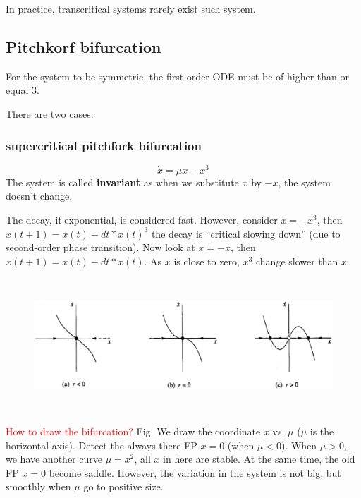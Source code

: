 In practice, transcritical systems rarely exist such system. 

\subsection{Pitchkorf bifurcation}
\label{sec:pitchk-bifurc}

For the system to be symmetric, the first-order ODE must be of higher
than or equal 3.

There are two cases:

\subsubsection{supercritical pitchfork bifurcation}
\label{sec:supercr-pitchf-bifur}

\begin{equation}
  \label{eq:671}
  \dot{x} = \mu x - x^3
\end{equation}
The system is called {\bf invariant} as when we substitute $x$ by
$-x$, the system doesn't change.

The decay, if exponential, is considered fast. However, consider
$\dot{x}=-x^3$, then $x(t+1)=x(t)-dt*x(t)^3$ the decay is ``critical
slowing down'' (due to second-order phase transition). Now look at
$\dot{x}=-x$, then $x(t+1)=x(t)-dt*x(t)$. As $x$ is close to zero,
$x^3$ change slower than $x$. 

\begin{figure}[hbt]
  \centerline{\includegraphics[height=5cm,
    angle=0]{./images/pitchfork_ex1.eps}}
\caption{}
\label{fig:pitchfork_ex1}
\end{figure}

\textcolor{red}{How to draw the bifurcation?} Fig. We draw the
coordinate $x$ vs. $\mu$ ($\mu$ is the horizontal axis). Detect the
always-there FP $x=0$ (when $\mu<0$). When $\mu>0$, we have another
curve $\mu=x^2$, all $x$ in here are stable. At the same time, the old
FP $x=0$ become saddle. However, the variation in the system is not
big, but smoothly when $\mu$ go to positive size.

